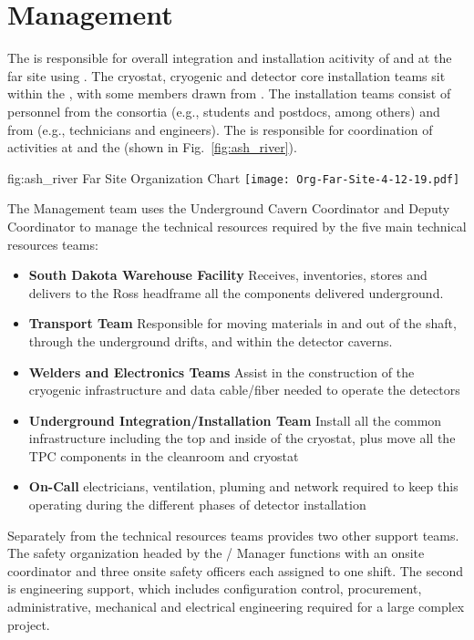 \section{ Management}
\label{vl:tc-facility_mgmt}

The  is responsible for overall integration and
installation acitivity of  and  at the far
site using . The cryostat, cryogenic and detector core
installation teams sit within the , with some members drawn
from . The installation teams consist of personnel from the
consortia (e.g., students and postdocs, among others) and from
 (e.g., technicians and engineers). The  is responsible
for coordination of activities at  and the  
(shown in Fig.~\ref{fig:ash_river}).
\begin{dunefigure}{fig:ash_river}
  {Far Site Organization Chart}
  \texttt{[image: Org-Far-Site-4-12-19.pdf]}
\end{dunefigure}


The  Management team uses the Underground Cavern Coordinator and
Deputy Coordinator to manage the technical resources required by the
five main technical resources teams:
\begin{itemize}
\item {\bf South Dakota Warehouse Facility} Receives, inventories,
  stores and delivers to the Ross headframe all the components
  delivered underground.
 \item {\bf Transport Team} Responsible for moving materials in and out
   of the shaft, through the underground drifts, and within the
   detector caverns.
 \item {\bf Welders and Electronics Teams} Assist in the construction of
   the cryogenic infrastructure and data cable/fiber needed to operate
   the detectors
 \item {\bf Underground Integration/Installation Team} Install all the
   common infrastructure including the top and inside of the cryostat,
   plus move all the TPC components in the cleanroom and cryostat
 \item {\bf On-Call} electricians, ventilation, pluming and network
   required to keep this operating during the different phases of
   detector installation
\end{itemize}

Separately from the technical resources teams  provides two
other support teams.  The safety organization headed by the
/  Manager functions with an
onsite  coordinator and three onsite safety officers each
assigned to one shift.  The second is engineering support, which
includes configuration control, procurement, administrative,
mechanical and electrical engineering required for a large complex
project.

